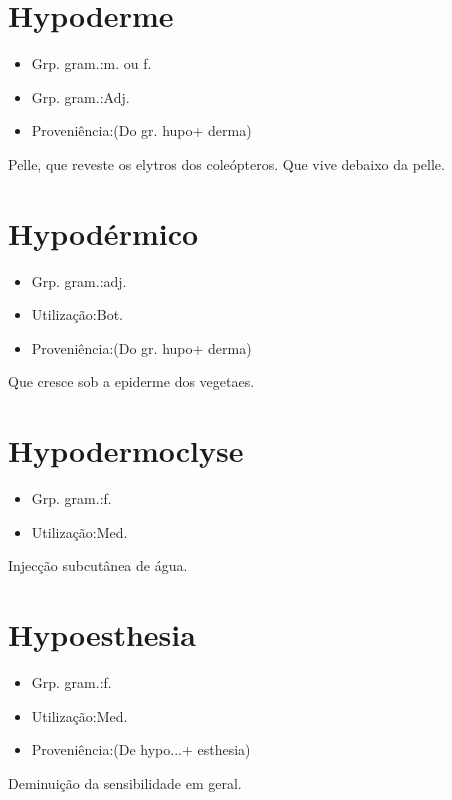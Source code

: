 \documentclass{article}
\begin{document}
\section{Hypoderme}
\begin{itemize}
\item {Grp. gram.:m.  ou  f.}
\end{itemize}
\begin{itemize}
\item {Grp. gram.:Adj.}
\end{itemize}
\begin{itemize}
\item {Proveniência:(Do gr. \textunderscore hupo\textunderscore  + \textunderscore derma\textunderscore )}
\end{itemize}
Pelle, que reveste os elytros dos coleópteros.
Que vive debaixo da pelle.
\section{Hypodérmico}
\begin{itemize}
\item {Grp. gram.:adj.}
\end{itemize}
\begin{itemize}
\item {Utilização:Bot.}
\end{itemize}
\begin{itemize}
\item {Proveniência:(Do gr. \textunderscore hupo\textunderscore  + \textunderscore derma\textunderscore )}
\end{itemize}
Que cresce sob a epiderme dos vegetaes.
\section{Hypodermoclyse}
\begin{itemize}
\item {Grp. gram.:f.}
\end{itemize}
\begin{itemize}
\item {Utilização:Med.}
\end{itemize}
Injecção subcutânea de água.
\section{Hypoesthesia}
\begin{itemize}
\item {Grp. gram.:f.}
\end{itemize}
\begin{itemize}
\item {Utilização:Med.}
\end{itemize}
\begin{itemize}
\item {Proveniência:(De \textunderscore hypo...\textunderscore  + \textunderscore esthesia\textunderscore )}
\end{itemize}
Deminuição da sensibilidade em geral.
\end{document}
